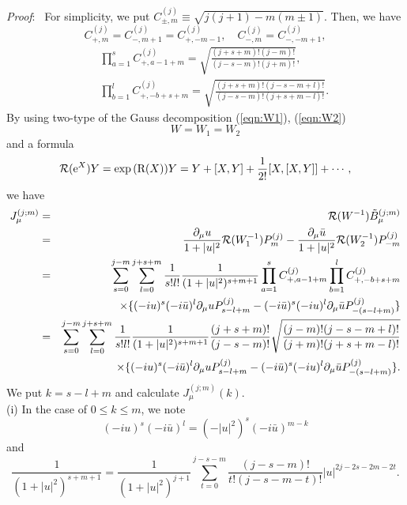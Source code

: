 \documentclass[makeidx,12pt,openany]{report}
\begin{document}
\textit{Proof}: \ 
For simplicity, we put $C_{\pm,m}^{(j)} \equiv \sqrt{j(j+1)-m(m \pm 1)}$. 
Then, we have 
\begin{equation}
C_{+,m}^{(j)}=C_{-,m+1}^{(j)}=C_{+,-m-1}^{(j)}, \quad 
 C_{-,m}^{(j)}=C_{-,-m+1}^{(j)}, 
\end{equation}
\begin{eqnarray}
&&\prod_{a=1}^s C_{+,a-1+m}^{(j)}=
 \sqrt{\frac{(j+s+m)!(j-m)!}{(j-s-m)!(j+m)!}}, \\
&&\prod_{b=1}^l C_{+,-b+s+m}^{(j)}=
 \sqrt{\frac{(j+s+m)!(j-s-m+l)!}{(j-s-m)!(j+s+m-l)!}}.
\end{eqnarray}
By using two-type of the Gauss decomposition (\ref{eqn:W1}), (\ref{eqn:W2})
$$ W=W_1=W_2 $$
and a formula 
\begin{equation}
 \mbox{$\cal{R}$}(\mbox{e}^X)Y=\exp{(\mbox{R}(X))}Y=
  Y+[X,Y]+\frac{1}{2!}[X,[X,Y]]+\cdots ,
\end{equation}
we have 
\begin{eqnarray*}
J_{\mu}^{(j;m)}&=&\mbox{$\cal{R}$}(W^{-1})\tilde{B}_{\mu}^{(j;m)} \\
&=&\frac{\partial_{\mu}u}{1+|u|^2}\mbox{$\cal{R}$}(W_1^{-1})P_m^{(j)}
 -\frac{\partial_{\mu}\bar{u}}{1+|u|^2}\mbox{$\cal{R}$}(W_2^{-1})P_{-m}^{(j)} 
 \\
&=&\sum_{s=0}^{j-m}\sum_{l=0}^{j+s+m}\frac{1}{s!l!}\frac{1}{(1+|u|^2)^{s+m+1}}
 \prod_{a=1}^s C_{+,a-1+m}^{(j)}\prod_{b=1}^l C_{+,-b+s+m}^{(j)} \\
&& \times \{ (-iu)^s (-i\bar{u})^l \partial_{\mu}u P_{s-l+m}^{(j)}
 -(-i\bar{u})^s (-iu)^l \partial_{\mu}\bar{u} P_{-(s-l+m)}^{(j)} \} \\
&=&\sum_{s=0}^{j-m}\sum_{l=0}^{j+s+m}\frac{1}{s!l!}\frac{1}{(1+|u|^2)^{s+m+1}}
 \frac{(j+s+m)!}{(j-s-m)!}\sqrt{\frac{(j-m)!(j-s-m+l)!}{(j+m)!(j+s+m-l)!}} \\
&& \times \{ (-iu)^s (-i\bar{u})^l \partial_{\mu}u P_{s-l+m}^{(j)}
 -(-i\bar{u})^s (-iu)^l \partial_{\mu}\bar{u} P_{-(s-l+m)}^{(j)} \} .
\end{eqnarray*}
We put $k=s-l+m$ and calculate $J_{\mu}^{(j;m)}(k)$. \\
(i) In the case of $0 \le k \le m$, we note 
\begin{equation}
 (-iu)^s (-i\bar{u})^l=(-|u|^2)^s (-i\bar{u})^{m-k}
\end{equation}
and 
\begin{equation}
 \frac{1}{(1+|u|^2)^{s+m+1}}=\frac{1}{(1+|u|^2)^{j+1}}
  \sum_{t=0}^{j-s-m}\frac{(j-s-m)!}{t!(j-s-m-t)!}|u|^{2j-2s-2m-2t}. 
\end{equation}
\end{document}

